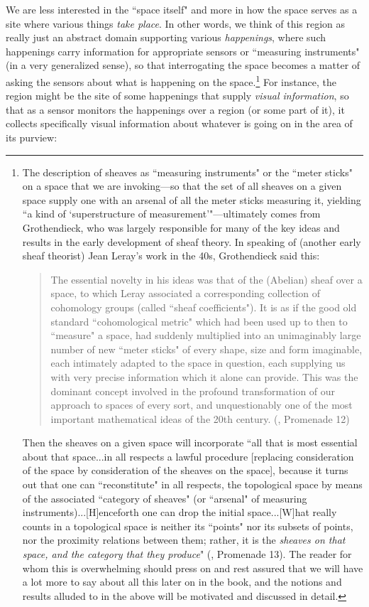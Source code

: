 \documentclass[11pt]{book}
\theoremstyle{definition}
\theoremstyle{definition}
\theoremstyle{definition}
\theoremstyle{theorem}
\theoremstyle{definition}
\begin{document}
	We are less interested in the ``space itself" and more in how the space serves as a site where various things \textit{take place}. In other words, we think of this region as really just an abstract domain supporting various \textit{happenings}, where such happenings carry information for appropriate sensors or ``measuring instruments" (in a very generalized sense), so that interrogating the space becomes a matter of asking the sensors about what is happening on the space.\footnote{The description of sheaves as ``measuring instruments" or the ``meter sticks" on a space that we are invoking---so that the set of all sheaves on a given space supply one with an arsenal of all the meter sticks measuring it, yielding ``a kind of `superstructure of measurement'"---ultimately comes from Grothendieck, who was largely responsible for many of the key ideas and results in the early development of sheaf theory. In speaking of (another early sheaf theorist) Jean Leray's work in the 40s, Grothendieck said this: 
		\begin{quote}
			The essential novelty in his ideas was that of the (Abelian) sheaf over a space, to which Leray associated a corresponding collection of cohomology groups (called ``sheaf coefficients"). It is as if the good old standard ``cohomological metric" which had been used up to then to ``measure" a space, had suddenly multiplied into an unimaginably large number of new ``meter sticks" of every shape, size and form imaginable, each intimately adapted to the space in question, each supplying us with very precise information which it alone can provide. This was the dominant concept involved in the profound transformation of our approach to spaces of every sort, and unquestionably one of the most important mathematical ideas of the 20th century. (\cite{grothendieck_recoltes_1986}, Promenade 12) 
	\end{quote}
Then the sheaves on a given space will incorporate ``all that is most essential about that space...in all respects a lawful procedure [replacing consideration of the space by consideration of the sheaves on the space], because it turns out that one can ``reconstitute" in all respects, the topological space by means of the associated ``category of sheaves" (or ``arsenal" of measuring instruments)...[H]enceforth one can drop the initial space...[W]hat really counts in a topological space is neither its ``points" nor its subsets of points, nor the proximity relations between them; rather, it is the \textit{sheaves on that space, and the category that they produce}" (\cite{grothendieck_recoltes_1986}, Promenade 13). The reader for whom this is overwhelming should press on and rest assured that we will have a lot more to say about all this later on in the book, and the notions and results alluded to in the above will be motivated and discussed in detail.} For instance, the region might be the site of some happenings that supply \textit{visual information}, so that as a sensor monitors the happenings over a region (or some part of it), it collects specifically visual information about whatever is going on in the area of its purview:   
\end{document}
